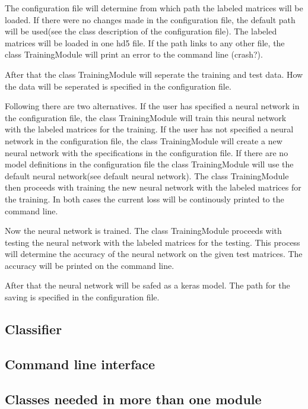 \documentclass[parskip=full]{scrartcl}
\begin{document}
The configuration file will determine from which path the labeled matrices will be loaded. If there were no changes made in the configuration file, the default path will be used(see the class description of the configuration file). The labeled matrices will be loaded in one hd5 file. If the path links to any other file, the class TrainingModule will print an error to the command line (crash?). \newline

After that the class TrainingModule will seperate the training and test data. How the data will be seperated is specified in the configuration file.\newline

Following there are two alternatives. If the user has specified a neural network in the configuration file, the class TrainingModule will train this neural network with the labeled matrices for the training. If the user has not specified a neural network in the configuration file, the class TrainingModule will create a new neural network with the specifications in the configuration file. If there are no model definitions in the configuration file the class TrainingModule will use the default neural network(see default neural network). The class TrainingModule then proceeds with training the new neural network with the labeled matrices for the training. In both cases the current loss will be continously printed to the command line.\newline

Now the neural network is trained. The class TrainingModule proceeds with testing the neural network with the labeled matrices for the testing. This process will determine the accuracy of the neural network on the given test matrices. The accuracy will be printed on the command line.\newline

After that the neural network will be safed as a keras model. The path for the saving is specified in the configuration file.




\subsection{Classifier}
\subsection{Command line interface}
\subsection{Classes needed in more than one module}
\end{document}
